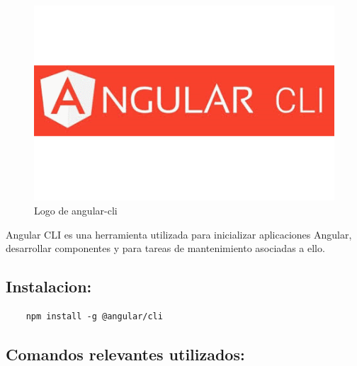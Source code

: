 \documentclass[openright,twoside,10pt]{book}
\begin{document}
    \begin{figure}[H]
        \begin{center}
            \includegraphics[scale=0.3]{img/angular-cli.png}
        \end{center}
        \caption{Logo de angular-cli}
    \end{figure}
    
    Angular CLI es una herramienta utilizada para inicializar aplicaciones
    Angular, desarrollar componentes y para tareas de mantenimiento
    asociadas a ello. \cite{angular_cli}
    
    \subsection{Instalacion:}\label{instalacion}
    
    \begin{verbatim}
    npm install -g @angular/cli
    \end{verbatim}
    
    \subsection{Comandos relevantes
    utilizados:}\label{comandos-relevantes-utilizados}
    
\end{document}
